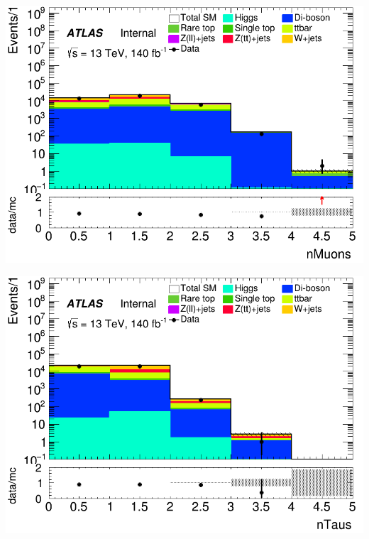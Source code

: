 \documentclass[usenames,dvipsnames]{beamer}
\begin{document}
\begin{frame}
    \begin{minipage}{0.32\textwidth}
        \centering
        \includegraphics[width=\textwidth]{graphics/L_met/L_met_nMuons.png}
    \end{minipage}
    \hfill
    \begin{minipage}{0.32\textwidth}
        \centering
        \includegraphics[width=\textwidth]{graphics/L_met/L_met_nTaus.png}
    \end{minipage}
    \hfill
    \begin{minipage}{0.32\textwidth}
        \centering

\end{minipage}
\end{frame}
\end{document}
